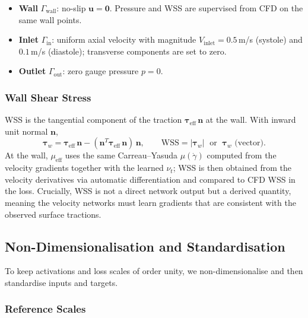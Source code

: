 \documentclass[11pt,a4paper]{article}
\begin{document}
\begin{itemize}
\item \textbf{Wall} $\Gamma_{\text{wall}}$: no-slip $\mathbf{u} = \mathbf{0}$. Pressure and WSS are supervised from CFD on the same wall points.
\item \textbf{Inlet} $\Gamma_{\text{in}}$: uniform axial velocity with magnitude $V_{\text{inlet}} = 0.5$\,m/s (systole) and $0.1$\,m/s (diastole); transverse components are set to zero.
\item \textbf{Outlet} $\Gamma_{\text{out}}$: zero gauge pressure $p = 0$.
\end{itemize}

\subsubsection{Wall Shear Stress}

WSS is the tangential component of the traction $\boldsymbol{\tau}_{\text{eff}}\,\mathbf{n}$ at the wall. With inward unit normal $\mathbf{n}$,
\begin{equation}
\boldsymbol{\tau}_w = \boldsymbol{\tau}_{\text{eff}}\,\mathbf{n} - (\mathbf{n}^T \boldsymbol{\tau}_{\text{eff}}\,\mathbf{n})\,\mathbf{n}, \qquad \text{WSS} = |\boldsymbol{\tau}_w| \;\text{ or }\; \boldsymbol{\tau}_w \text{ (vector)}.
\label{eq:wss}
\end{equation}
At the wall, $\mu_{\text{eff}}$ uses the same Carreau--Yasuda $\mu(\dot{\gamma})$ computed from the velocity gradients together with the learned $\nu_t$; WSS is then obtained from the velocity derivatives via automatic differentiation and compared to CFD WSS in the loss. Crucially, WSS is not a direct network output but a derived quantity, meaning the velocity networks must learn gradients that are consistent with the observed surface tractions.

\subsection{Non-Dimensionalisation and Standardisation}
\label{sec:nondim}

To keep activations and loss scales of order unity, we non-dimensionalise and then standardise inputs and targets.

\subsubsection{Reference Scales}
\end{document}

